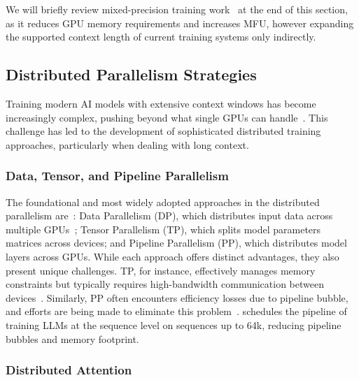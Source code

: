 We will briefly review mixed-precision training work~\citep{narang2017mixed, kalamkar2019study, sun2019hybrid, peng2023fp8, dubey2024llama, Deepseek2024DeepSeek-V3} at the end of this section, as it reduces GPU memory requirements and increases MFU, however expanding the supported context length of current training systems only indirectly.

\subsection{Distributed Parallelism Strategies}\label{sec6_1}

Training modern AI models with extensive context windows has become increasingly complex, pushing beyond what single GPUs can handle~\citep{semianalysis2023BlackwellInferenceTraining}. This challenge has led to the development of sophisticated distributed training approaches, particularly when dealing with long context.

\subsubsection{Data, Tensor, and Pipeline Parallelism}

The foundational and most widely adopted approaches in the distributed parallelism are~\citep{semianalysis2023BlackwellInferenceTraining}: Data Parallelism (DP), which distributes input data across multiple GPUs~\citep{li2020pytorch, zhao2023pytorch, Zhang2024SimpleFSDPSF, sun2024co2}; Tensor Parallelism (TP), which splits model parameters matrices across devices; and Pipeline Parallelism (PP), which distributes model layers across GPUs. While each approach offers distinct advantages, they also present unique challenges. TP, for instance, effectively manages memory constraints but typically requires high-bandwidth communication between devices~\citep{dong2024lowbitcommunicationtensorparallel}. Similarly, PP often encounters efficiency losses due to pipeline bubble, and efforts are being made to eliminate this problem~\citep{Li2021TeraPipeTP, Qi2024ZeroB, arfeen2024pipefillusinggpusbubbles}. \citet{sun2024seq1f1befficientsequencelevelpipeline} schedules the pipeline of training LLMs at the sequence level on sequences up to 64k, reducing pipeline bubbles and memory footprint.

\subsubsection{Distributed Attention}   

